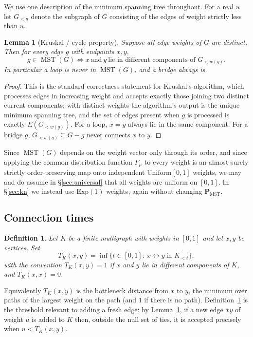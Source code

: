 \documentclass[10pt,a4paper]{amsart}
\newtheorem{lemma}[theorem]{Lemma}
\newtheorem{definition}[theorem]{Definition}
\newcommand{\MST}{\operatorname{MST}}
\newcommand{\PMST}{\mathbf{P}_{\mathrm{MST}}}
\begin{document}
We use one description of the minimum spanning tree throughout. For a real $u$
let $G_{<u}$ denote the subgraph of $G$ consisting of the edges of weight
strictly less than $u$.

\begin{lemma}[Kruskal / cycle property]
\label{lem:kruskal}
Suppose all edge weights of $G$ are distinct. Then for every edge $g$ with
endpoints $x,y$,
\[
g\in\MST(G)\iff x\ \text{and}\ y\ \text{lie in different components of }
G_{<w(g)} .
\]
In particular a loop is never in $\MST(G)$, and a bridge always is.
\end{lemma}

\begin{proof}
This is the standard correctness statement for Kruskal's algorithm, which
processes edges in increasing weight and accepts exactly those joining two
distinct current components; with distinct weights the algorithm's output is the
unique minimum spanning tree, and the set of edges present when $g$ is processed
is exactly $E(G_{<w(g)})$. For a loop, $x=y$ always lie in the same component.
For a bridge $g$, $G_{<w(g)}\subseteq G-g$ never connects $x$ to $y$.
\end{proof}

Since $\MST(G)$ depends on the weight vector only through its order, and since
applying the common distribution function $F_\mu$ to every weight is an
almost surely strictly order-preserving map onto independent
$\mathrm{Uniform}[0,1]$ weights, we may and do assume in \S\ref{sec:universal}
that all weights are uniform on $[0,1]$. In \S\ref{sec:kn} we instead use
$\mathrm{Exp}(1)$ weights, again without changing $\PMST$.

\subsection{Connection times}

\begin{definition}
\label{def:T}
Let $K$ be a finite multigraph with weights in $[0,1]$ and let $x,y$ be
vertices. Set
\[
T_K(x,y)=\inf\{t\in[0,1]:\ x\leftrightarrow y\ \text{in }K_{<t}\},
\]
with the convention $T_K(x,y)=1$ if $x$ and $y$ lie in different components of
$K$, and $T_K(x,x)=0$.
\end{definition}

Equivalently $T_K(x,y)$ is the bottleneck distance from $x$ to $y$, the minimum
over paths of the largest weight on the path (and $1$ if there is no path).
Definition~\ref{def:T} is the threshold relevant to adding a fresh edge: by
Lemma~\ref{lem:kruskal}, if a new edge $xy$ of weight $u$ is added to $K$ then,
outside the null set of ties, it is accepted precisely when $u<T_K(x,y)$.
\end{document}
